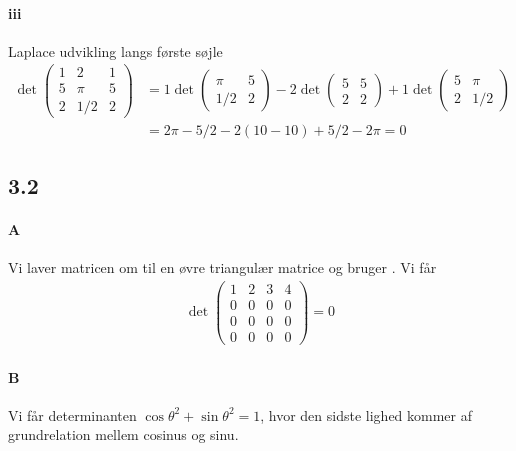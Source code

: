 			\paragraph{iii} Laplace udvikling langs første søjle
				\begin{align*}
					\det \left(\begin{array}{rrr}{1} & {2} & {1} \\ {5} & {\pi} & {5} \\ {2} & {1 / 2} & {2}\end{array}\right) &= 1 \det \left(\begin{array}{rr} \pi & 5 \\ 1/2 & 2 \end{array}\right) -2 \det \left(\begin{array}{rr} 5 & 5 \\ 2 & 2 \end{array}\right) + 1 \det \left(\begin{array}{rr} 5 & \pi \\ 2 & 1/2 \end{array}\right)\\
					&= 2\pi-5/2-2(10-10)+5/2-2\pi=0
				\end{align*}

		\subsection{3.2}

			\paragraph{A} Vi laver matricen om til en øvre triangulær matrice og bruger \cite[Sætning 3.3.3]{hesselholt2017}. Vi får
				\begin{align*}
					\det \left(\begin{array}{llll}{1} & {2} & {3} & {4} \\ {0} & {0} & {0} & {0} \\ {0} & {0} & {0} & {0} \\ {0} & {0} & {0} & {0}\end{array}\right) =0
				\end{align*}

			\paragraph{B} Vi får determinanten $\cos \theta ^2 + \sin \theta ^2 =1$, hvor den sidste lighed kommer af grundrelation mellem cosinus og sinu.

